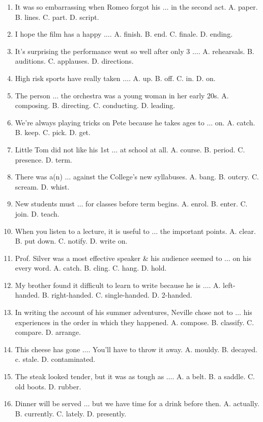 \documentclass{article}
\numberwithin{equation}{section}
\begin{document}
\begin{enumerate}[leftmargin=5mm]
	\item It was so embarrassing when Romeo forgot his $\ldots$ in the second act. A. paper. B. lines. C. part. D. script.
	\item I hope the film has a happy $\ldots$. A. finish. B. end. C. finale. D. ending.
	\item It's surprising the performance went so well after only 3 $\ldots$. A. rehearsals. B. auditions. C. applauses. D. directions.
	\item High risk sports have really taken $\ldots$. A. up. B. off. C. in. D. on.
	\item The person $\ldots$ the orchestra was a young woman in her early 20s. A. composing. B. directing. C. conducting. D. leading.
	\item We're always playing tricks on Pete because he takes ages to $\ldots$ on. A. catch. B. keep. C. pick. D. get.
	\item Little Tom did not like his 1st $\ldots$ at school at all. A. course. B. period. C. presence. D. term.
	\item There was a(n) $\ldots$ against the College's new syllabuses. A. bang. B. outcry. C. scream. D. whist.
	\item New students must $\ldots$ for classes before term begins. A. enrol. B. enter. C. join. D. teach.
	\item When you listen to a lecture, it is useful to $\ldots$ the important points. A. clear. B. put down. C. notify. D. write on.
	\item Prof. Silver was a most effective speaker \& his audience seemed to $\ldots$ on his every word. A. catch. B. cling. C. hang. D. hold.
	\item My brother found it difficult to learn to write because he is $\ldots$. A. left-handed. B. right-handed. C. single-handed. D. 2-handed.
	\item In writing the account of his summer adventures, Neville chose not to $\ldots$ his experiences in the order in which they happened. A. compose. B. classify. C. compare. D. arrange.
	\item This cheese has gone $\ldots$. You'll have to throw it away. A. mouldy. B. decayed. c. stale. D. contaminated.
	\item The steak looked tender, but it was as tough as $\ldots$. A. a belt. B. a saddle. C. old boots. D. rubber.
	\item Dinner will be served $\ldots$ but we have time for a drink before then. A. actually. B. currently. C. lately. D. presently.

\end{enumerate}
\end{document}
